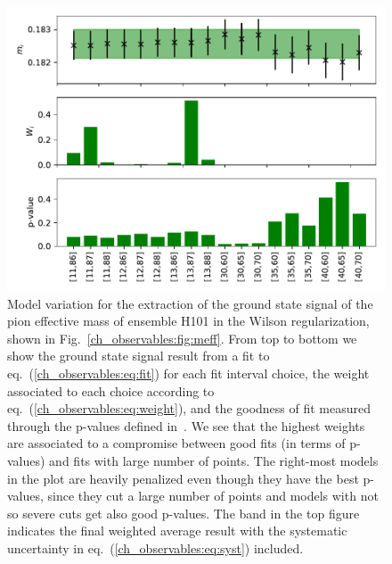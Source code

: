 \begin{figure}
\centering
	\includegraphics[width=1.\textwidth]{./cap3/figs/m_H101_pion_wil.pdf}
    \caption{Model variation for the extraction of the ground state signal of the pion effective mass of ensemble H101 in the Wilson regularization, shown in Fig.~\ref{ch_observables:fig:meff}. From top to bottom we show the ground state signal result from a fit to eq.~(\ref{ch_observables:eq:fit}) for each fit interval choice, the weight associated to each choice according to eq.~(\ref{ch_observables:eq:weight}), and the goodness of fit measured through the p-values defined in~\citep{Bruno:2022mfy}. We see that the highest weights are associated to a compromise between good fits (in terms of p-values) and fits with large number of points. The right-most models in the plot are heavily penalized even though they have the best p-values, since they cut a large number of points and models with not so severe cuts get also good p-values. The band in the top figure indicates the final weighted average result with the systematic uncertainty in eq.~(\ref{ch_observables:eq:syst}) included.}
    \label{ch_observables:fig:model_av}
\end{figure}



